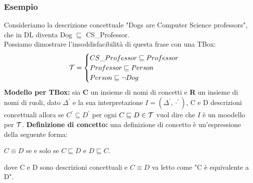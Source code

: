 \documentclass[../main.tex]{subfiles}
\begin{document}
   \subsubsection{Esempio}
   Consideriamo la descrizione concettuale "Dogs are Computer Science professors", che in DL diventa Dog $\sqsubseteq$ CS\_Professor.\\
   Possiamo dimostrare l'insoddisfacibilità di questa frase con una TBox:
   \begin{equation*}
      \mathcal{T}=
      \begin{cases}
         CS\_Professor \sqsubseteq Professor\\
         Professor \sqsubseteq Person\\
         Person \sqsubseteq \lnot Dog
      \end{cases}
   \end{equation*}
   \spazio
   \textbf{Modello per TBox:} sia \textbf{C} un insieme di nomi di concetti e \textbf{R} un insieme di nomi di ruoli, dato $\Delta^\prime$ e la sua interpretazione $I = (\Delta^\prime, \cdot^\prime)$, C e D descrizioni concettuali allora se $C^\prime \subseteq D^\prime$ per ogni $C \sqsubseteq D \in \mathcal{T}$ vuol dire che $I$ è un moodello per $\mathcal{T}$.
   \spazio
   \textbf{Definizione di concetto:} una definizione di concetto è un'espressione della seguente forma:
   \begin{center}
      $C \equiv D$ se e solo se $C \sqsubseteq D$ e $D \sqsubseteq C$.
   \end{center}
   dove C e D sono descrizioni concettuali e $C \equiv D$ va letto come "C è equivalente a D".
\end{document}
